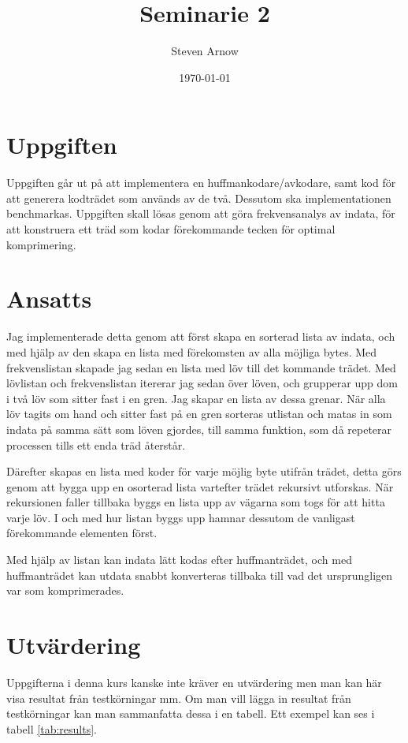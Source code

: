\documentclass[a4paper, 11pt]{article}
\title{Seminarie 2}
\author{Steven Arnow}
\date{\today}
\begin{document}
\maketitle 

\section{Uppgiften}

Uppgiften går ut på att implementera en huffmankodare/avkodare, samt kod för att generera kodträdet som används av de två. Dessutom ska implementationen benchmarkas. Uppgiften skall lösas genom att göra frekvensanalys av indata, för att konstruera ett träd som kodar förekommande tecken för optimal komprimering. 

\section{Ansatts}

Jag implementerade detta genom att först skapa en sorterad lista av indata, och med hjälp av den skapa en lista med förekomsten av alla möjliga bytes. Med frekvenslistan skapade jag sedan en lista med löv till det kommande trädet. Med lövlistan och frekvenslistan itererar jag sedan över löven, och grupperar upp dom i två löv som sitter fast i en gren. Jag skapar en lista av dessa grenar. När alla löv tagits om hand och sitter fast på en gren sorteras utlistan och matas in som indata på samma sätt som löven gjordes, till samma funktion, som då repeterar processen tills ett enda träd återstår.

Därefter skapas en lista med koder för varje möjlig byte utifrån trädet, detta görs genom att bygga upp en osorterad lista vartefter trädet rekursivt utforskas. När rekursionen faller tillbaka byggs en lista upp av vägarna som togs för att hitta varje löv. I och med hur listan byggs upp hamnar dessutom de vanligast förekommande elementen först.

Med hjälp av listan kan indata lätt kodas efter huffmanträdet, och med huffmanträdet kan utdata snabbt konverteras tillbaka till vad det ursprungligen var som komprimerades.

\section{Utvärdering}


Uppgifterna i denna kurs kanske inte kräver en utvärdering men man kan
här visa resultat från testkörningar mm. Om man vill lägga in resultat
från testkörningar kan man sammanfatta dessa i en tabell. Ett exempel
kan ses i tabell \ref{tab:results}. 
\end{document}
